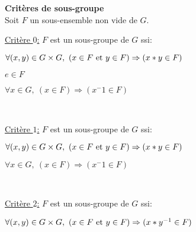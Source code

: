 \documentclass[12pt,twoside,a4paper]{article}
\begin{document}
			\begin{flushleft}
				\textbf{Crit\`eres de sous-groupe}\\
				Soit $F$ un sous-ensemble non vide de $G$.
				\begin{liste}
					\item \underline{Crit\`ere $0$:} $F$ est un sous-groupe de $G$ ssi:
						\begin{liste}
							\item[\cercle1] $\forall (x,y)\in G\times G,\ (x\in F\text{ et } y\in F)\Rightarrow (x*y\in F)$
							\item[\cercle2] $e\in F$
							\item[\cercle3] $\forall x\in G,\ (x\in F)\Rightarrow(x^-1\in F)$
						\end{liste}\ \\
					\item \underline{Crit\`ere $1$:} $F$ est un sous-groupe de $G$ ssi:
						\begin{liste}
							\item[\cercle1] $\forall (x,y)\in G\times G,\ (x\in F\text{ et } y\in F)\Rightarrow (x*y\in F)$
							\item[\cercle2] $\forall x\in G,\ (x\in F)\Rightarrow(x^-1\in F)$
						\end{liste}\ \\
					\item \underline{Crit\`ere $2$:} $F$ est un sous-groupe de $G$ ssi:
						\begin{liste}
							\item[\cercle1] $\forall (x,y)\in G\times G,\ (x\in F\text{ et } y\in F)\Rightarrow (x*y^{-1}\in F)$
						\end{liste}
				\end{liste}
			\end{flushleft}
\end{document}
